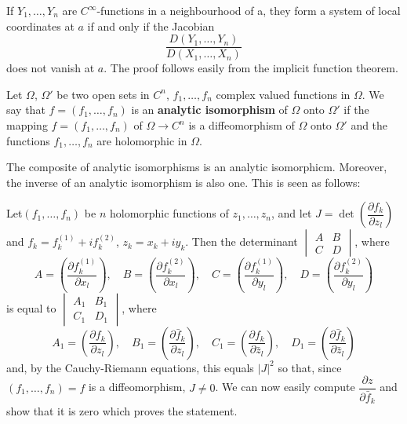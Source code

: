 If $Y_1, \ldots, Y_n$ are $C^\infty$-functions in a neighbourhood of
a, they form a system of local coordinates at $a$ if and only if the
Jacobian
$$
\frac{D(Y_1, \ldots, Y_n)}{D(X_1, \ldots, X_n)}
$$
does not vanish at $a$. The proof follows easily from the implicit
function theorem.

\medskip
{}

\begin{defi*}
Let $\Omega$, $\Omega'$ be two open sets in $C^n$, $f_1, \ldots, f_n$
complex valued functions in $\Omega$. We say that $f = (f_1, \ldots,
f_n)$ is an \textbf{analytic isomorphism} of $\Omega$ onto $\Omega'$
if the mapping $f=(f_1, \ldots, f_n)$ of $\Omega \to C^n$ is a
diffeomorphism of $\Omega$ onto $\Omega'$ and the functions $f_1 ,
\ldots, f_n$ are holomorphic in $\Omega$.
\end{defi*}

The composite of analytic isomorphisms is an analytic
isomorphicm. Moreover, the inverse of an analytic isomorphism is also
one. This is seen as follows:

Let\pageoriginale $(f_1, \ldots, f_n)$ be $n$ holomorphic functions of
$z_1, \ldots, z_n$, and let $J = \det \left(\dfrac{\partial
  f_k}{\partial z_l} \right)$ and $f_k = f^{(1)}_k + i f^{(2)}_k$,
$z_k = x_k + i y_k$. Then the determinant $\begin{vmatrix}
  A & B\\ C & D \end{vmatrix}$, where 
$$
A = \left(\frac{\partial f^{(1)}_k}{\partial x_l} \right), \quad
B = \left(\frac{\partial f^{(2)}_k}{\partial x_l} \right), \quad 
C = \left(\frac{\partial f^{(1)}_k}{\partial y_l} \right), \quad 
D = \left(\frac{\partial f^{(2)}_k}{\partial y_l} \right) 
$$
is equal to $\begin{vmatrix}
A_1 & B_1\\ C_1 & D_1 \end{vmatrix}$, where 
$$
A_1 = \left(\frac{\partial f_k}{\partial z_l} \right), \quad 
B_1 = \left(\frac{\partial \bar{f}_k}{\partial z_l} \right), \quad 
C_1 = \left(\frac{\partial f_k}{\partial \bar{z}_l} \right), \quad 
D_1 = \left(\frac{\partial \bar{f}_k}{\partial \bar{z}_l} \right)
$$
and, by the Cauchy-Riemann equations, this equals $|J|^2$ so that,
since $(f_1, \ldots, f_n) = f$ is a diffeomorphism, $J\neq 0$. We can
now easily compute $\dfrac{\partial z}{\partial \bar{f}_k}$ and show
that it is zero which proves the statement.

